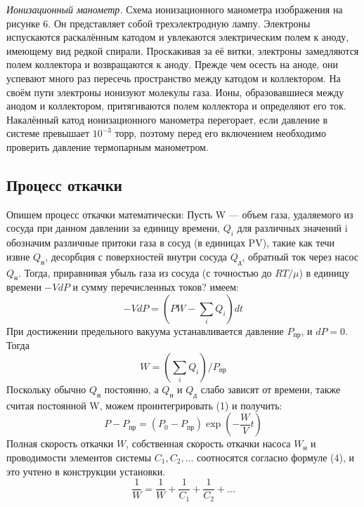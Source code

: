 \documentclass[12pt,a4paper]{article}
\begin{document}
\textit{Ионизационный манометр.} Схема ионизационного манометра изображения на рисунке 6. Он представляет собой трехэлектродную лампу. Электроны испускаются раскалённым катодом и увлекаются электрическим полем к аноду, имеющему вид редкой спирали. Проскакивая за её витки, электроны замедляются полем коллектора и возвращаются к аноду. Прежде чем осесть на аноде, они успевают много раз пересечь пространство между катодом и коллектором. На своём пути электроны ионизуют молекулы газа. Ионы, образовавшиеся между анодом и коллектором, притягиваются полем коллектора и определяют его ток. \\
  Накалённый катод ионизационного манометра перегорает, если давление в системе превышает $10^{-3}$ торр, поэтому перед его включением необходимо проверить давление термопарным манометром. \\
 \subsection*{Процесс откачки}
Опишем процесс откачки математически: 
Пусть W --- объем газа, удаляемого из сосуда при данном давлении за единицу времени, $Q_i$ для различных значений i обозначим различные притоки газа в сосуд (в единицах PV), такие как течи извне $Q_\text{и}$, десорбция с поверхностей внутри сосуда $Q_\text{д}$, обратный ток через насос $Q_\text{н}$. Тогда, приравнивая убыль газа из сосуда (с точностью до $RT/\mu$) в единицу времени $-VdP$ и сумму перечисленных токов? имеем:
 \begin{equation}
 	-VdP = (PW - \sum_i Q_i)dt
 \end{equation}
 При достижении предельного вакуума устанавливается давление $P_{\text{пр}}$, и $dP = 0$. Тогда
 \begin{equation}
 	 W = ( \sum_i Q_i )/P_{\text{пр}}
 \end{equation}
 Поскольку обычно $Q_\text{и}$ постоянно, а $Q_\text{н}$ и $Q_\text{д}$ слабо зависят от времени, также считая постоянной W, можем проинтегрировать (1) и получить:
 \begin{equation}
 	P - P_{\text{пр}} = (P_0 - P_{\text{пр}})\exp(-\frac{W}{V}t)
 \end{equation}
Полная скорость откачки $W$, собственная скорость откачки насоса $W_{\text{н}}$ и проводимости элементов системы $C_1, C_2,...$ соотносятся согласно формуле (4), и это учтено в конструкции установки.
 \begin{equation}
 \frac{1}{W} = \frac{1}{W} + \frac{1}{C_1} + \frac{1}{C_2} + ...
\end{equation}
\end{document}
